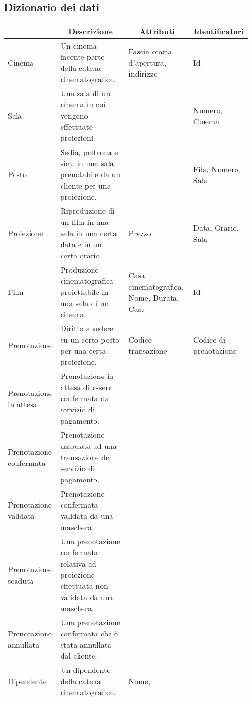 \subsection*{Dizionario dei dati}
%
%
\begin{longtable}{|p{2.5cm}|p{7.1cm}|p{2.5cm}|p{3.2cm}|}
    \hline
    \rowcolor{tblhdrcolor}
    \multicolumn{1}{|c|}{\textbf{Entità}}
     & \multicolumn{1}{|c|}{\textbf{Descrizione}}
     & \multicolumn{1}{|c|}{\textbf{Attributi}}
     & \multicolumn{1}{|c|}{\textbf{Identificatori}}
    \\ \hline
    Cinema
     & Un cinema facente parte della catena cinematografica.
     & Fascia oraria d'apertura,
    indirizzo
     & Id
    \\\hline
    Sala
     & Una sala di un cinema in cui vengono effettuate proiezioni.
     &
     & Numero, Cinema
    \\\hline
    Posto
     & Sedia, poltrona e sim. in una sala prenotabile da un cliente per
    una proiezione.
     &
     & Fila, Numero, Sala
    \\\hline
    Proiezione
     & Riproduzione di un film in una sala in una certa data e in un
    certo orario.
     & Prezzo
     & Data, Orario, Sala
    \\\hline
    Film
     & Produzione cinematografica proiettabile in una sala di un cinema.
     & Casa cinematografica, Nome, Durata, Cast
     & Id
    \\\hline
    Prenotazione
     & Diritto a sedere su un certo posto per una certa proiezione.
     & Codice transazione
     & Codice di prenotazione
    \\\hline
    Prenotazione in attesa
     & Prenotazione in attesa di essere confermata dal servizio di pagamento.
     &
     &
    \\\hline
    Prenotazione confermata
     & Prenotazione associata ad una transazione del servizio di pagamento.
     &
     &
    \\\hline
    Prenotazione validata
     & Prenotazione confermata validata da una maschera.
     &
     &
    \\\hline
    Prenotazione scaduta
     & Una prenotazione confermata relativa ad proiezione effettuata non
    validata da una maschera.
     &
     &
    \\\hline
    Prenotazione annullata
     & Una prenotazione confermata che è stata annullata dal cliente.
     &
     &
    \\\hline
    Dipendente
     & Un dipendente della catena cinematografica.
     & Nome,


\end{longtable}
